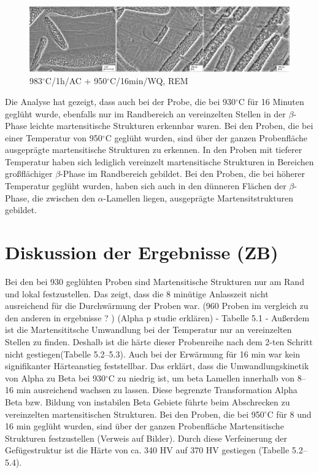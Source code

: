 \begin{figure}
	\centering
	\includegraphics[width=1.0\linewidth]{./Bilder/Abbildung 18}
	\caption[Abbildung 18]{983$^\circ$C/1h/AC + 950$^\circ$C/16min/WQ, REM}
	\label{fig:abbildung-18}
\end{figure}

Die Analyse hat gezeigt, dass auch bei der Probe, die bei 930$^\circ$C für 16 Minuten geglüht wurde, ebenfalls nur im Randbereich an vereinzelten Stellen in der $\beta$-Phase leichte martensitische Strukturen erkennbar waren.
Bei den Proben, die bei einer Temperatur von 950$^\circ$C geglüht wurden, sind über der ganzen Probenfläche ausgeprägte martensitische Strukturen zu erkennen. In den Proben mit tieferer Temperatur haben sich lediglich vereinzelt martensitische Strukturen in Bereichen großflächiger $\beta$-Phase im Randbereich gebildet. Bei den Proben, die bei höherer Temperatur geglüht wurden, haben sich auch in den dünneren Flächen der $\beta$-Phase, die zwischen den $\alpha$-Lamellen liegen, ausgeprägte Martensitstrukturen gebildet.


\section{Diskussion der Ergebnisse (ZB)}

Bei  den bei 930  geglühten Proben sind Martensitische Strukturen nur  am Rand und lokal festzustellen. Das zeigt, dass die 8 minütige Anlasszeit nicht ausreichend für die Durchwärmung der Proben war. (960 Proben im vergleich zu den anderen in ergebnisse ? )
(Alpha p studie erklären) - Tabelle 5.1 - 
Außerdem ist die Martensititsche Umwandlung bei der Temperatur  nur an vereinzelten  Stellen zu finden. Deshalb ist die härte dieser Probenreihe nach dem 2-ten Schritt nicht gestiegen(Tabelle 5.2--5.3). Auch bei der Erwärmung für 16 min war kein signifikanter Härteanstieg feststellbar. Das erklärt, dass die Umwandlungskinetik von Alpha zu Beta bei 930$^\circ$C zu niedrig ist, um beta Lamellen  innerhalb von 8--16 min ausreichend  wachsen zu lassen. Diese begrenzte Transformation Alpha Beta bzw. Bildung von instabilen Beta Gebiete führte  beim Abschrecken zu vereinzelten martensitischen Strukturen.
Bei den Proben, die bei 950$^\circ$C für 8 und 16 min geglüht wurden, sind über der ganzen Probenfläche Martensitische Strukturen festzustellen (Verweis auf Bilder). Durch diese Verfeinerung der Gefügestruktur ist die Härte von ca. 340 HV auf 370 HV gestiegen (Tabelle 5.2--5.4). 

